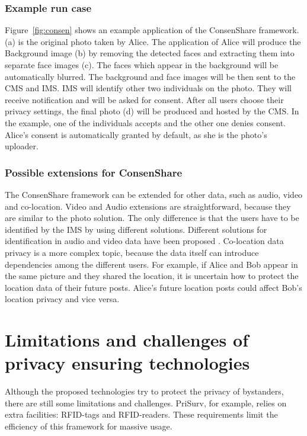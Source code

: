 \documentclass[conference]{IEEEtran}
\begin{document}
\subsubsection{Example run case}
Figure~\ref{fig:consen} shows an example application of the ConsenShare framework. (a) is the original photo taken by Alice. The application of Alice will produce the Background image (b) by removing the detected faces and extracting them into separate face images (c). The faces which appear in the background will be automatically blurred. The background and face images will be then sent to the \ac{CMS} and \ac{IMS}. \ac{IMS} will identify other two individuals on the photo. They will receive notification and will be asked for consent. After all users choose their privacy settings, the final photo (d) will be produced and hosted by the \ac{CMS}. In the example, one of the individuals accepts and the other one denies consent. Alice’s consent is automatically granted by default, as she is the photo’s uploader. 

\subsubsection{Possible extensions for ConsenShare}
The ConsenShare framework can be extended for other data, such as audio, video and co-location. Video and Audio extensions are straightforward, because they are similar to the photo solution. The only difference is that the users have to be identified by the \ac{IMS} by using different solutions. Different solutions for identification in audio and video data have been proposed \cite{reynolds2002, mansour2015}. Co-location data privacy is a more complex topic, because the data itself can introduce dependencies among the different users. For example, if Alice and Bob appear in the same picture and they shared the location, it is uncertain how to protect the location data of their future posts. Alice’s future location posts could affect Bob’s location privacy and vice versa. 

\section{Limitations and challenges of privacy ensuring technologies}\label{Limitations}
Although the proposed technologies try to protect the privacy of bystanders, there are still some limitations and challenges. PriSurv, for example, relies on extra facilities: \ac{RFID}-tags and \ac{RFID}-readers. These requirements limit the efficiency of this framework for massive usage. 
\end{document}
